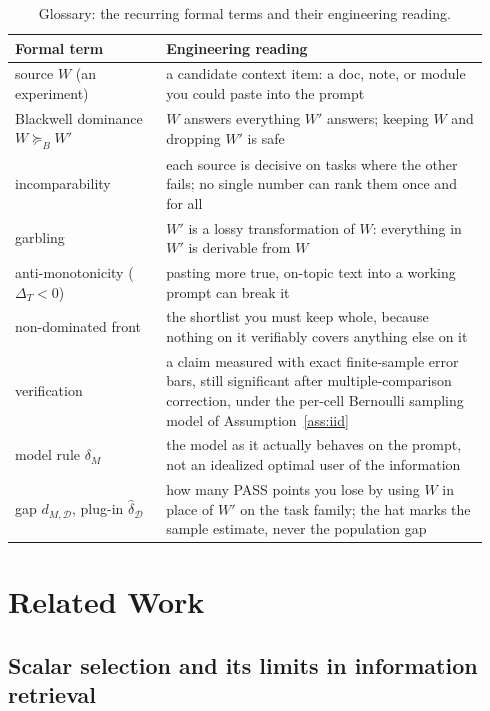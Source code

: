 \documentclass[11pt]{article}
\theoremstyle{plain}
\theoremstyle{definition}
\theoremstyle{remark}
\newcommand{\dhat}{\widehat{\delta}}
\newcommand{\Dcal}{\mathcal{D}}
\newcommand{\Bord}{\succeq_{B}}
\begin{document}
\begin{table}[t]
\caption{Glossary: the recurring formal terms and their engineering reading.}
\centering
\small
\begin{tabular}{@{}p{0.30\linewidth}p{0.64\linewidth}@{}}
\toprule
Formal term & Engineering reading \\
\midrule
source $W$ (an experiment) & a candidate context item: a doc, note, or module you could paste into the prompt \\
Blackwell dominance $W \Bord W'$ & $W$ answers everything $W'$ answers; keeping $W$ and dropping $W'$ is safe \\
incomparability & each source is decisive on tasks where the other fails; no single number can rank them once and for all \\
garbling & $W'$ is a lossy transformation of $W$: everything in $W'$ is derivable from $W$ \\
anti-monotonicity ($\Delta_T<0$) & pasting more true, on-topic text into a working prompt can break it \\
non-dominated front & the shortlist you must keep whole, because nothing on it verifiably covers anything else on it \\
verification & a claim measured with exact finite-sample error bars, still significant after multiple-comparison correction, under the per-cell Bernoulli sampling model of Assumption~\ref{ass:iid} \\
model rule $\delta_M$ & the model as it actually behaves on the prompt, not an idealized optimal user of the information \\
gap $d_{M,\Dcal}$, plug-in $\dhat_{\Dcal}$ & how many PASS points you lose by using $W$ in place of $W'$ on the task family; the hat marks the sample estimate, never the population gap \\
\bottomrule
\end{tabular}
\label{tab:glossary}
\end{table}

\section{Related Work}
\label{sec:related}

\subsection{Scalar selection and its limits in information retrieval}
\label{sec:related-scalar}\label{sec:related-ir}
\end{document}
